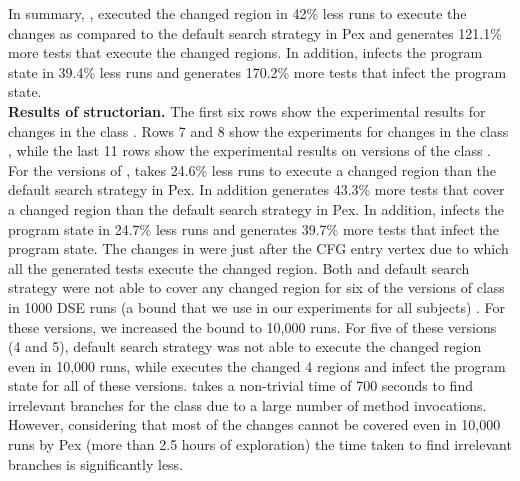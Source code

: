 In summary, , executed the changed region in 42\% less runs to execute the changes as compared to the default search strategy in Pex and generates 121.1\% more tests that execute the changed regions. In addition,  infects the program state in 39.4\% less runs and generates 170.2\% more tests that infect the program state.
\\ \textbf{Results of structorian.} The first six rows show the experimental results for changes in the class . Rows 7 and 8 show the experiments for changes in the class , 
 while the last 11 rows show the experimental results on versions of the class . For the versions of ,  takes 24.6\% less runs to execute a changed region than the default search strategy in Pex. In addition  generates 43.3\% more tests that cover a changed region than the default search strategy in Pex. In addition,  infects the program state in 24.7\% less runs and generates 39.7\% more tests that infect the program state. The changes in  were just after the CFG entry vertex due to which all the generated tests execute the changed region.
 	Both  and default search strategy were not able to cover any changed region for six of the versions of class  in 1000 DSE runs (a bound that we use in our experiments for all subjects) . For these versions, we increased the bound to 10,000 runs. For five of these versions (4 and 5), default search strategy was not able to execute the changed region even in 10,000 runs, while  executes the changed 4 regions and infect the program state for all of these versions.  takes a non-trivial time of 700 seconds to find irrelevant branches for the class  due to a large number of method invocations. However, considering that most of the changes cannot be covered even in 10,000 runs by Pex (more than 2.5 hours of exploration) the time taken to find irrelevant branches is significantly less. 
